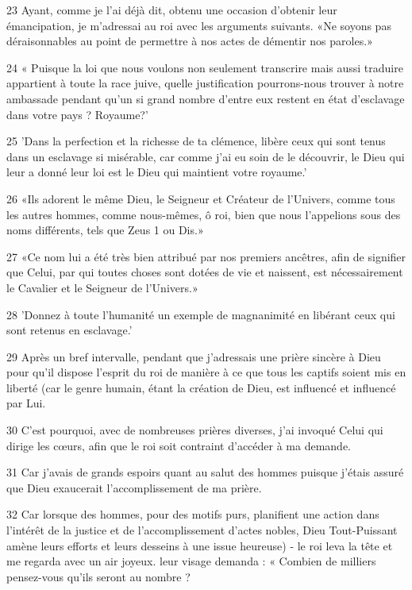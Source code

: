 \par 23 Ayant, comme je l'ai déjà dit, obtenu une occasion d'obtenir leur émancipation, je m'adressai au roi avec les arguments suivants. «Ne soyons pas déraisonnables au point de permettre à nos actes de démentir nos paroles.»

\par 24 « Puisque la loi que nous voulons non seulement transcrire mais aussi traduire appartient à toute la race juive, quelle justification pourrons-nous trouver à notre ambassade pendant qu'un si grand nombre d'entre eux restent en état d'esclavage dans votre pays ? Royaume?'

\par 25 'Dans la perfection et la richesse de ta clémence, libère ceux qui sont tenus dans un esclavage si misérable, car comme j'ai eu soin de le découvrir, le Dieu qui leur a donné leur loi est le Dieu qui maintient votre royaume.'

\par 26 «Ils adorent le même Dieu, le Seigneur et Créateur de l'Univers, comme tous les autres hommes, comme nous-mêmes, ô roi, bien que nous l'appelions sous des noms différents, tels que Zeus 1 ou Dis.»

\par 27 «Ce nom lui a été très bien attribué par nos premiers ancêtres, afin de signifier que Celui, par qui toutes choses sont dotées de vie et naissent, est nécessairement le Cavalier et le Seigneur de l'Univers.»

\par 28 'Donnez à toute l'humanité un exemple de magnanimité en libérant ceux qui sont retenus en esclavage.'

\par 29 Après un bref intervalle, pendant que j'adressais une prière sincère à Dieu pour qu'il dispose l'esprit du roi de manière à ce que tous les captifs soient mis en liberté (car le genre humain, étant la création de Dieu, est influencé et influencé par Lui.

\par 30 C'est pourquoi, avec de nombreuses prières diverses, j'ai invoqué Celui qui dirige les cœurs, afin que le roi soit contraint d'accéder à ma demande.

\par 31 Car j'avais de grands espoirs quant au salut des hommes puisque j'étais assuré que Dieu exaucerait l'accomplissement de ma prière.

\par 32 Car lorsque des hommes, pour des motifs purs, planifient une action dans l'intérêt de la justice et de l'accomplissement d'actes nobles, Dieu Tout-Puissant amène leurs efforts et leurs desseins à une issue heureuse) - le roi leva la tête et me regarda avec un air joyeux. leur visage demanda : « Combien de milliers pensez-vous qu'ils seront au nombre ?

